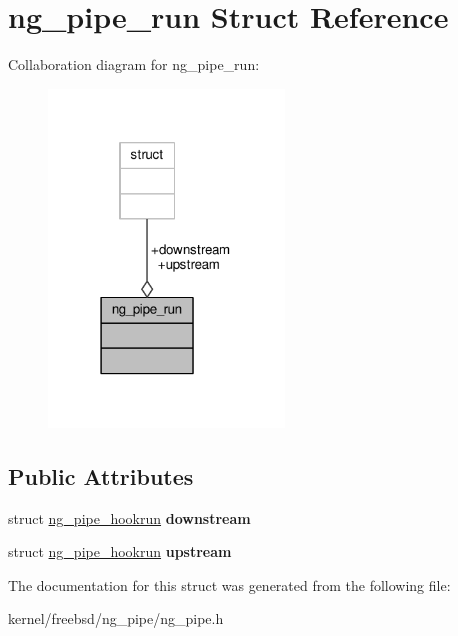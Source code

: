 \hypertarget{structng__pipe__run}{\section{ng\+\_\+pipe\+\_\+run Struct Reference}
\label{structng__pipe__run}
}


Collaboration diagram for ng\+\_\+pipe\+\_\+run\+:
\nopagebreak
\begin{figure}[H]
\begin{center}
\leavevmode
\includegraphics[width=178pt]{structng__pipe__run__coll__graph}
\end{center}
\end{figure}
\subsection*{Public Attributes}
\begin{DoxyCompactItemize}
\item 
\hypertarget{structng__pipe__run_a6da322349c977dcc4fc2c2b8b1ef9abc}{struct \hyperlink{structng__pipe__hookrun}{ng\+\_\+pipe\+\_\+hookrun} {\bfseries downstream}}\label{structng__pipe__run_a6da322349c977dcc4fc2c2b8b1ef9abc}

\item 
\hypertarget{structng__pipe__run_a380c7ea3f513f07bc0f966167826011f}{struct \hyperlink{structng__pipe__hookrun}{ng\+\_\+pipe\+\_\+hookrun} {\bfseries upstream}}\label{structng__pipe__run_a380c7ea3f513f07bc0f966167826011f}

\end{DoxyCompactItemize}


The documentation for this struct was generated from the following file\+:\begin{DoxyCompactItemize}
\item 
kernel/freebsd/ng\+\_\+pipe/ng\+\_\+pipe.\+h\end{DoxyCompactItemize}

